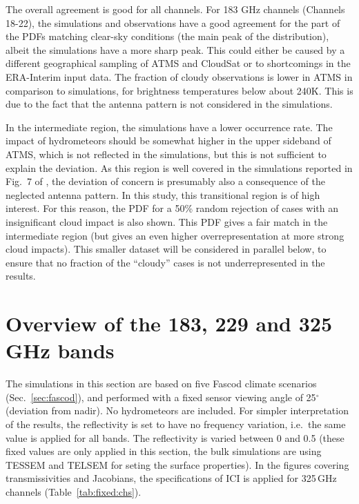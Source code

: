 \documentclass[12pt]{article}
\begin{document}
The overall agreement is good for all channels. For 183 GHz channels (Channels
18-22), the simulations and observations have a good agreement for the part of
the PDFs matching clear-sky conditions (the main peak of the distribution),
albeit the simulations have a more sharp peak. This could either be caused by a
different geographical sampling of ATMS and CloudSat or to shortcomings in the
ERA-Interim input data. The fraction of cloudy observations is lower in ATMS in
comparison to simulations, for brightness temperatures below about 240\.K. This
is due to the fact that the antenna pattern is not considered in the
simulations.

In the intermediate region, the simulations have a lower occurrence rate. The
impact of hydrometeors should be somewhat higher in the upper sideband of ATMS,
which is not reflected in the simulations, but this is not sufficient to
explain the deviation. As this region is well covered in the simulations
reported in Fig.~7 of \citet{eriksson:towar:20}, the deviation of concern is
presumably also a consequence of the neglected antenna pattern. In this study,
this transitional region is of high interest. For this reason, the PDF for a
50\% random rejection of cases with an insignificant cloud impact is also
shown. This PDF gives a fair match in the intermediate region (but gives an
even higher overrepresentation at more strong cloud impacts). This smaller
dataset will be considered in parallel below, to ensure that no fraction of the
``cloudy'' cases is not underrepresented in the results.




\section{Overview of the 183, 229 and 325\,GHz bands}
\label{sec:overview}
% 
The simulations in this section are based on five Fascod climate scenarios
(Sec.~\ref{sec:fascod}), and performed with a fixed sensor viewing angle of
25$^\circ$ (deviation from nadir). No hydrometeors are included. For simpler
interpretation of the results, the reflectivity is set to have no frequency
variation, i.e.\ the same value is applied for all bands. The reflectivity is
varied between 0 and 0.5 (these fixed values are only applied in this section,
the bulk simulations are using TESSEM and TELSEM for seting the surface
properties). In the figures covering transmissivities and Jacobians, the
specifications of ICI is applied for 325\,GHz channels
(Table~\ref{tab:fixed:chs}).
\end{document}
